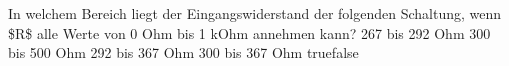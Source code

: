     {In welchem Bereich liegt der Eingangswiderstand der folgenden Schaltung, wenn \$R\$ alle Werte von 0 Ohm bis 1 kOhm annehmen kann? }
    {267 bis 292 Ohm}
    {300 bis 500 Ohm}
    {292 bis 367 Ohm}
    {300 bis 367 Ohm}
    {true}{false}